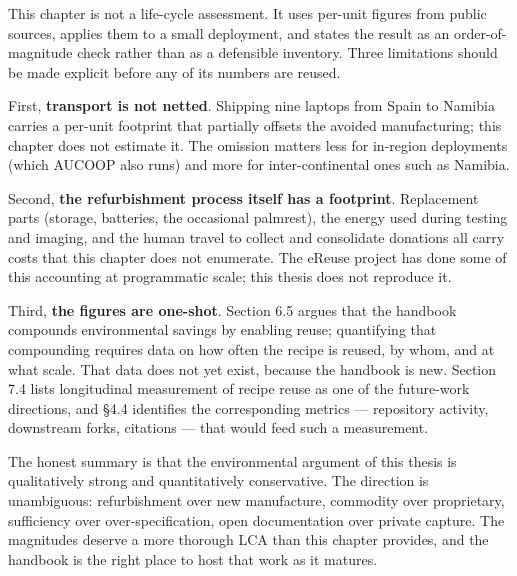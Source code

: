 This chapter is not a life-cycle assessment. It uses per-unit figures
from public sources, applies them to a small deployment, and states the
result as an order-of-magnitude check rather than as a defensible
inventory. Three limitations should be made explicit before any of its
numbers are reused.

First, \textbf{transport is not netted}. Shipping nine laptops from
Spain to Namibia carries a per-unit footprint that partially offsets the
avoided manufacturing; this chapter does not estimate it. The omission
matters less for in-region deployments (which AUCOOP also runs) and more
for inter-continental ones such as Namibia.

Second, \textbf{the refurbishment process itself has a footprint}.
Replacement parts (storage, batteries, the occasional palmrest), the
energy used during testing and imaging, and the human travel to collect
and consolidate donations all carry costs that this chapter does not
enumerate. The eReuse project has done some of this accounting at
programmatic scale; this thesis does not reproduce it.

Third, \textbf{the figures are one-shot}. Section 6.5 argues that the
handbook compounds environmental savings by enabling reuse; quantifying
that compounding requires data on how often the recipe is reused, by
whom, and at what scale. That data does not yet exist, because the
handbook is new. Section 7.4 lists longitudinal measurement of recipe
reuse as one of the future-work directions, and §4.4 identifies the
corresponding metrics --- repository activity, downstream forks,
citations --- that would feed such a measurement.

The honest summary is that the environmental argument of this thesis is
qualitatively strong and quantitatively conservative. The direction is
unambiguous: refurbishment over new manufacture, commodity over
proprietary, sufficiency over over-specification, open documentation
over private capture. The magnitudes deserve a more thorough LCA than
this chapter provides, and the handbook is the right place to host that
work as it matures.
